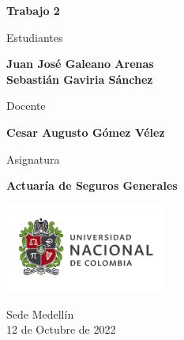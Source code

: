 \begin{titlepage}
   \Large{
   \begin{center}
       \vspace*{1cm}

       \textbf{Trabajo 2}

            
       \vspace{1.5cm}
       
       Estudiantes
       
       \vspace{0.5cm}
        
	\textbf{Juan José Galeano Arenas} \\

	\textbf{Sebastián Gaviria Sánchez}

              \vspace{1cm}
       
       Docente
       
       \vspace{0.5cm}

       \textbf{Cesar Augusto Gómez Vélez}
       
       \vspace{0.4cm}

       \vspace{1.4cm}
       
       Asignatura
       
       \vspace{0.5cm}

       \textbf{Actuaría de Seguros Generales}

       \vfill

            
       \vspace{0.4cm}
     
       \includegraphics[width=0.4\textwidth]{logounal.png}
            
       Sede Medellín\\
       12 de Octubre de 2022
       
   \end{center}
   }
\end{titlepage}